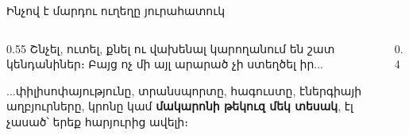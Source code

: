 
\begin{frame}{Ինչով է մարդու ուղեղը յուրահատուկ}
  \begin{columns}[c]
    \begin{column}{0.55\textwidth}
      Շնչել, ուտել, քնել ու վախենալ կարողանում են շատ կենդանիներ։ Բայց ոչ մի այլ արարած չի ստեղծել իր...\par\medskip
      \begin{bookquote}
        ...փիլիսոփայությունը, տրանսպորտը, հագուստը, էներգիայի աղբյուրները, կրոնը կամ \textbf{մակարոնի թեկուզ մեկ տեսակ}, էլ չասած՝ երեք հարյուրից ավելի։
      \end{bookquote}
    \end{column}
    \begin{column}{0.4\textwidth}
      \centering
      \ \ \par\smallskip
      \ \par\medskip
    \end{column}
  \end{columns}
\end{frame}

